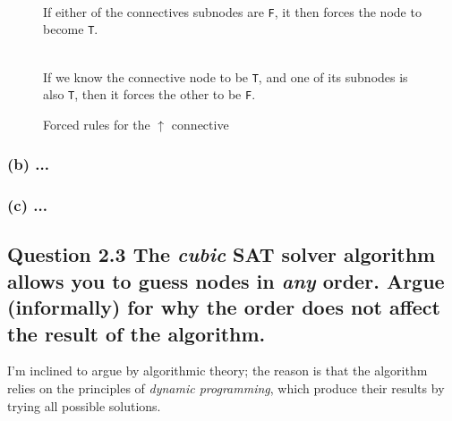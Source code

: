 \begin{figure}[H]
\begin{multicols}{3}
\\
	If either of the connectives subnodes are {\tt F}, it then forces the
	node to become {\tt T}.
	
	\vfill
	\columnbreak
	
	\\
	If we know the connective node to be {\tt T}, and one of its subnodes is
	also {\tt T}, then it forces the other to be {\tt F}.
	
	\end{multicols}
	\label{fig:uparrow-forced-rules}
	\caption{Forced rules for the $\uparrow$ connective}
\end{figure}

\subsubsection*{(b) \mdseries ...}
\subsubsection*{(c) \mdseries ...}

\subsection*{Question 2.3 \mdseries The {\it cubic} SAT solver algorithm
allows you to guess nodes in {\it any} order. Argue (informally) for why the
order does not affect the result of the algorithm.}
I'm inclined to argue by algorithmic theory; the reason is that the algorithm
relies on the principles of {\it dynamic programming}, which produce their
results by trying all possible solutions.

